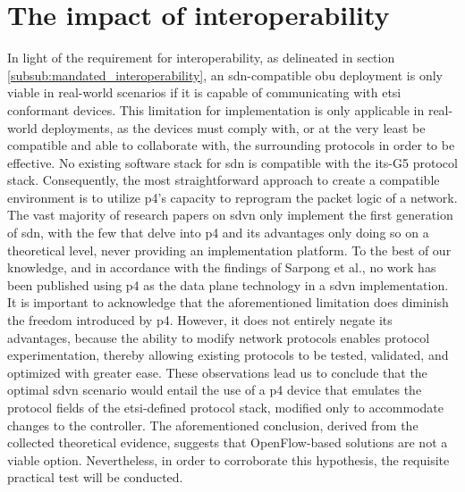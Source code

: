 \section{The impact of interoperability}
In light of the requirement for interoperability, as delineated in section \ref{subsub:mandated_interoperability}, an \gls{sdn}-compatible \gls{obu} deployment is only viable in real-world scenarios if it is capable of communicating with \gls{etsi} conformant devices. This limitation for implementation is only applicable in real-world deployments, as the devices must comply with, or at the very least be compatible and able to collaborate with, the surrounding protocols in order to be effective. No existing software stack for \gls{sdn} is compatible with the \gls{its}-G5 protocol stack. Consequently, the most straightforward approach to create a compatible environment is to utilize \gls{p4}’s capacity to reprogram the packet logic of a network. 
The vast majority of research papers on \gls{sdvn} only implement the first generation of \gls{sdn}, with the few that delve into \gls{p4} and its advantages only doing so on a theoretical level, never providing an implementation platform. To the best of our knowledge, and in accordance with the findings of Sarpong et al.\cite{sarpong_potential_2023}, no work has been published using \gls{p4} as the data plane technology in a \gls{sdvn} implementation. 
It is important to acknowledge that the aforementioned limitation does diminish the freedom introduced by \gls{p4}. However, it does not entirely negate its advantages, because the ability to modify network protocols enables protocol experimentation, thereby allowing existing protocols to be tested, validated, and optimized with greater ease.
These observations lead us to conclude that the optimal \gls{sdvn} scenario would entail the use of a \gls{p4} device that emulates the protocol fields of the \gls{etsi}-defined protocol stack, modified only to accommodate changes to the controller. The aforementioned conclusion, derived from the collected theoretical evidence, suggests that OpenFlow-based solutions are not a viable option. Nevertheless, in order to corroborate this hypothesis, the requisite practical test will be conducted.
